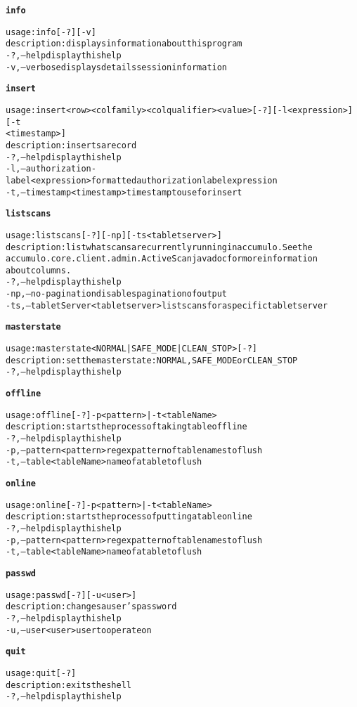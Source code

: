 \begin{alltt}
\textbf{info}

    usage: info [-?] [-v]
    description: displays information about this program
      -?,--help  display this help
      -v,--verbose	displays details session information

\textbf{insert}

    usage: insert <row> <colfamily> <colqualifier> <value> [-?] [-l <expression>] [-t
    	      <timestamp>]
    description: inserts a record
      -?,--help  display this help
      -l,--authorization-label <expression>  formatted authorization label expression
      -t,--timestamp <timestamp>  timestamp to use for insert

\textbf{listscans}

    usage: listscans [-?] [-np] [-ts <tablet server>]
    description: list what scans are currently running in accumulo. See the
    	      accumulo.core.client.admin.ActiveScan javadoc for more information
    	      about columns.
      -?,--help  display this help
      -np,--no-pagination  disables pagination of output
      -ts,--tabletServer <tablet server>  list scans for a specific tablet server

\textbf{masterstate}

    usage: masterstate <NORMAL|SAFE\_MODE|CLEAN\_STOP> [-?]
    description: set the master state: NORMAL, SAFE\_MODE or CLEAN\_STOP
      -?,--help  display this help

\textbf{offline}

    usage: offline [-?] -p <pattern> | -t <tableName>
    description: starts the process of taking table offline
      -?,--help  display this help
      -p,--pattern <pattern>  regex pattern of table names to flush
      -t,--table <tableName>  name of a table to flush

\textbf{online}

    usage: online [-?] -p <pattern> | -t <tableName>
    description: starts the process of putting a table online
      -?,--help  display this help
      -p,--pattern <pattern>  regex pattern of table names to flush
      -t,--table <tableName>  name of a table to flush

\textbf{passwd}

    usage: passwd [-?] [-u <user>]
    description: changes a user's password
      -?,--help  display this help
      -u,--user <user>  user to operate on

\textbf{quit}

    usage: quit [-?]
    description: exits the shell
      -?,--help  display this help


\end{alltt}

